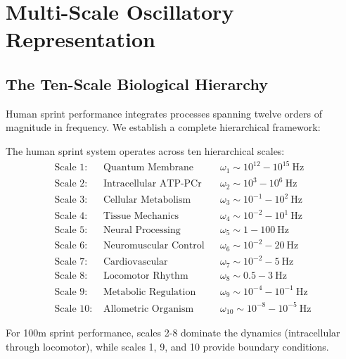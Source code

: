 \section{Multi-Scale Oscillatory Representation}

\subsection{The Ten-Scale Biological Hierarchy}

Human sprint performance integrates processes spanning twelve orders of magnitude in frequency. We establish a complete hierarchical framework:

\begin{definition}
The human sprint system operates across ten hierarchical scales:
\begin{align}
\text{Scale 1: } &\text{Quantum Membrane} && \omega_1 \sim 10^{12}-10^{15}~\text{Hz} \label{eq:scale1}\\
\text{Scale 2: } &\text{Intracellular ATP-PCr} && \omega_2 \sim 10^{3}-10^{6}~\text{Hz} \label{eq:scale2}\\
\text{Scale 3: } &\text{Cellular Metabolism} && \omega_3 \sim 10^{-1}-10^{2}~\text{Hz} \label{eq:scale3}\\
\text{Scale 4: } &\text{Tissue Mechanics} && \omega_4 \sim 10^{-2}-10^{1}~\text{Hz} \label{eq:scale4}\\
\text{Scale 5: } &\text{Neural Processing} && \omega_5 \sim 1-100~\text{Hz} \label{eq:scale5}\\
\text{Scale 6: } &\text{Neuromuscular Control} && \omega_6 \sim 10^{-2}-20~\text{Hz} \label{eq:scale6}\\
\text{Scale 7: } &\text{Cardiovascular} && \omega_7 \sim 10^{-2}-5~\text{Hz} \label{eq:scale7}\\
\text{Scale 8: } &\text{Locomotor Rhythm} && \omega_8 \sim 0.5-3~\text{Hz} \label{eq:scale8}\\
\text{Scale 9: } &\text{Metabolic Regulation} && \omega_9 \sim 10^{-4}-10^{-1}~\text{Hz} \label{eq:scale9}\\
\text{Scale 10: } &\text{Allometric Organism} && \omega_{10} \sim 10^{-8}-10^{-5}~\text{Hz} \label{eq:scale10}
\end{align}
\end{definition}

For 100m sprint performance, scales 2-8 dominate the dynamics (intracellular through locomotor), while scales 1, 9, and 10 provide boundary conditions.

